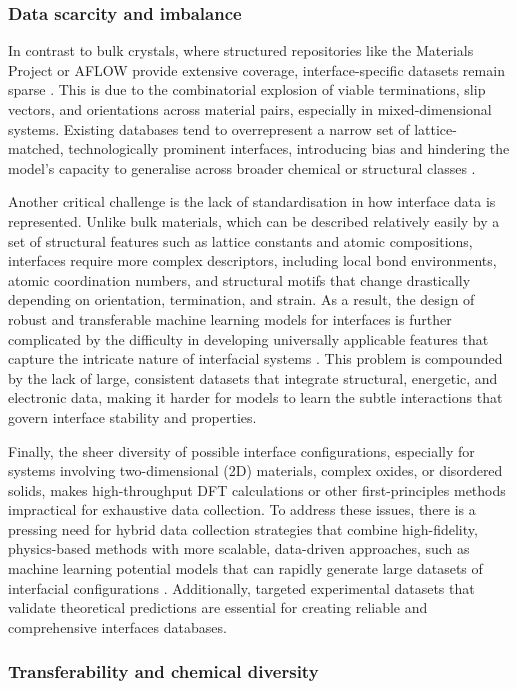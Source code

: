 \subsubsection{Data scarcity and imbalance}

In contrast to bulk crystals, where structured repositories like the Materials Project or AFLOW provide extensive coverage, interface-specific datasets remain sparse . This is due to the combinatorial explosion of viable terminations, slip vectors, and orientations across material pairs, especially in mixed-dimensional systems. Existing databases tend to overrepresent a narrow set of lattice-matched, technologically prominent interfaces, introducing bias and hindering the model's capacity to generalise across broader chemical or structural classes .

Another critical challenge is the lack of standardisation in how interface data is represented. Unlike bulk materials, which can be described relatively easily by a set of structural features such as lattice constants and atomic compositions, interfaces require more complex descriptors, including local bond environments, atomic coordination numbers, and structural motifs that change drastically depending on orientation, termination, and strain. As a result, the design of robust and transferable machine learning models for interfaces is further complicated by the difficulty in developing universally applicable features that capture the intricate nature of interfacial systems . This problem is compounded by the lack of large, consistent datasets that integrate structural, energetic, and electronic data, making it harder for models to learn the subtle interactions that govern interface stability and properties.

Finally, the sheer diversity of possible interface configurations, especially for systems involving two-dimensional (2D) materials, complex oxides, or disordered solids, makes high-throughput DFT calculations or other first-principles methods impractical for exhaustive data collection. To address these issues, there is a pressing need for hybrid data collection strategies that combine high-fidelity, physics-based methods with more scalable, data-driven approaches, such as machine learning potential models that can rapidly generate large datasets of interfacial configurations . Additionally, targeted experimental datasets that validate theoretical predictions are essential for creating reliable and comprehensive interfaces databases.

\subsubsection{Transferability and chemical diversity}

